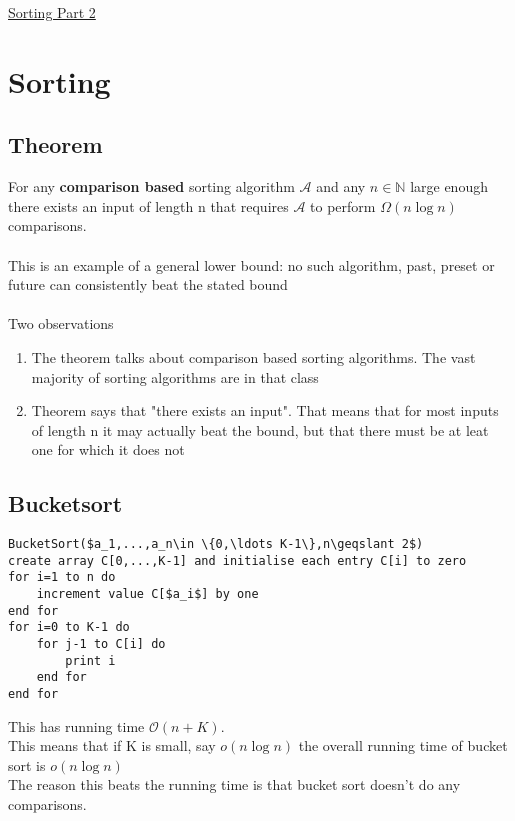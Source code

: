 \documentclass{article}[18pt]
\begin{document}
\begin{center}
\underline{\huge Sorting Part 2}
\end{center}
\section{Sorting}
\subsection{Theorem}
For any \textbf{comparison based} sorting algorithm $\mathcal{A}$ and any $n\in \mathbb{N}$ large enough there exists an input of length n that requires $\mathcal{A}$ to perform $\Omega(n\log n)$ comparisons.\\
\\
This is an example of a general lower bound: no such algorithm, past, preset or future can consistently beat the stated bound\\
\\
Two observations
\begin{enumerate}
	\item The theorem talks about comparison based sorting algorithms. The vast majority of sorting algorithms are in that class
	\item Theorem says that "there exists an input". That means that for most inputs of length n it may actually beat the bound, but that there must be at leat one for which it does not
\end{enumerate}
\subsection{Bucketsort}
\begin{lstlisting}
BucketSort($a_1,...,a_n\in \{0,\ldots K-1\},n\geqslant 2$)
create array C[0,...,K-1] and initialise each entry C[i] to zero
for i=1 to n do
	increment value C[$a_i$] by one
end for
for i=0 to K-1 do
	for j-1 to C[i] do
		print i
	end for
end for
\end{lstlisting}
This has running time $\mathcal{O}(n+K)$.\\
This means that if K is small, say $o(n\log n)$ the overall running time of bucket sort is $o(n\log n)$\\
The reason this beats the running time is that bucket sort doesn't do any comparisons.
\end{document}
